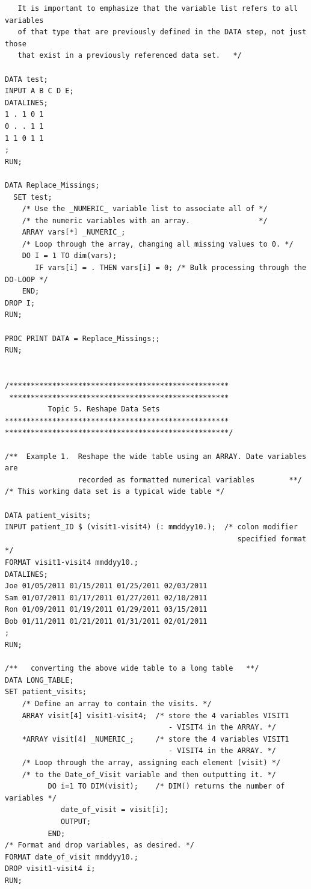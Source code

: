 \documentclass[
]{book}
\begin{document}
\begin{verbatim}
   It is important to emphasize that the variable list refers to all variables 
   of that type that are previously defined in the DATA step, not just those 
   that exist in a previously referenced data set.   */

DATA test;
INPUT A B C D E;
DATALINES;
1 . 1 0 1
0 . . 1 1
1 1 0 1 1
;
RUN;

DATA Replace_Missings;
  SET test;
    /* Use the _NUMERIC_ variable list to associate all of */
    /* the numeric variables with an array.                */
    ARRAY vars[*] _NUMERIC_;
    /* Loop through the array, changing all missing values to 0. */
    DO I = 1 TO dim(vars);
       IF vars[i] = . THEN vars[i] = 0; /* Bulk processing through the DO-LOOP */
    END;
DROP I;
RUN;

PROC PRINT DATA = Replace_Missings;;
RUN; 


/***************************************************
 ***************************************************
          Topic 5. Reshape Data Sets
****************************************************
****************************************************/

/**  Example 1.  Reshape the wide table using an ARRAY. Date variables are 
                 recorded as formatted numerical variables        **/
/* This working data set is a typical wide table */

DATA patient_visits;
INPUT patient_ID $ (visit1-visit4) (: mmddyy10.);  /* colon modifier 
                                                      specified format */
FORMAT visit1-visit4 mmddyy10.; 
DATALINES;
Joe 01/05/2011 01/15/2011 01/25/2011 02/03/2011
Sam 01/07/2011 01/17/2011 01/27/2011 02/10/2011
Ron 01/09/2011 01/19/2011 01/29/2011 03/15/2011
Bob 01/11/2011 01/21/2011 01/31/2011 02/01/2011
;
RUN;

/**   converting the above wide table to a long table   **/
DATA LONG_TABLE;
SET patient_visits;
    /* Define an array to contain the visits. */
    ARRAY visit[4] visit1-visit4;  /* store the 4 variables VISIT1 
                                      - VISIT4 in the ARRAY. */
    *ARRAY visit[4] _NUMERIC_;     /* store the 4 variables VISIT1 
                                      - VISIT4 in the ARRAY. */
    /* Loop through the array, assigning each element (visit) */
    /* to the Date_of_Visit variable and then outputting it. */
          DO i=1 TO DIM(visit);    /* DIM() returns the number of variables */
             date_of_visit = visit[i];
             OUTPUT;
          END;
/* Format and drop variables, as desired. */
FORMAT date_of_visit mmddyy10.;
DROP visit1-visit4 i;
RUN;


\end{verbatim}
\end{document}

